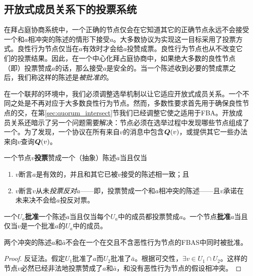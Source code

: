 \subsection{开放式成员关系下的投票系统}

在拜占庭协商系统中，一个正确的节点仅会在它知道其它的正确节点永远不会接受一个和$a$相冲突的陈述的情形下接受$a$。大多数协议为实现这一目标采用了投票方式。良性行为节点仅当在$a$有效时才会给$a$投赞成票。良性行为节点也从不改变它们的投票结果。因此，在一个中心化拜占庭协商中，如果绝大多数的良性节点（即{\quorum}）投票赞成$a$的话，那么接受$a$是安全的。当一个陈述收到必要的赞成票之后，我们称这样的陈述是\textit{被批准的}。

在一个联邦的环境中，我们必须调整选举机制以让它适应开放式成员关系。一个不同之处是{\quorum}不再对应于大多数良性行为节点。然而，多数性要求首先用于确保良性节点的{\quorum}交，在第\ref{sec:quorum_intersect}节我们已经调整它使之适用于FBA。开放成员关系还暗示了另一个问题需要解决：节点必须在选举过程中发现哪些节点组成了一个{\quorum}。为了发现{\quorum}，一个协议在所有来自$v$的消息中包含${\bm Q}(v)$，或提供其它一些办法来向$v$查询${\bm Q}(v)$。

\begin{definition}[投票]
        一个节点$v$\textbf{投票}赞成一个（抽象）陈述$a$当且仅当
        \begin{enumerate}
                \item $v$断言$a$是有效的，并且和其它已被$v$接受的陈述相一致；且
                \item $v$断言$v$从未\textit{投票反对}$a$——即，投票赞成一个和$a$相冲突的陈述——且$v$承诺在未来决不会给$a$投反对票。
        \end{enumerate}
\end{definition}

\begin{definition}[批准]
        一个{\quorum}$U_a$\textbf{批准}一个陈述$a$当且仅当每个$U_a$中的成员都投票赞成$a$。一个节点\textbf{批准}$a$当且仅当$v$是一个批准$a$的{\quorum}$U_a$中的成员。
\end{definition}

\begin{theorem}\label{thm:cannot_ratify_contradictory}
        两个冲突的陈述$a$和$\bar a$不会在一个在{\quorum}交且不含恶性行为节点的FBAS中同时被批准。
\end{theorem}

\begin{proof}
        反证法。假定{\quorum}$U_1$批准了$a$而{\quorum}$U_2$批准了$\bar a$。根据{\quorum}可交性，$\exists v\in U_1\cap U_2$。这样的节点$v$必然已经非法地投票赞成了$a$和$\bar a$，和没有恶性行为节点的假设相冲突。
\end{proof}

